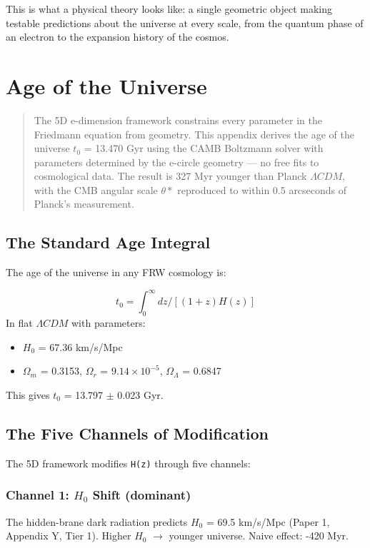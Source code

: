 \documentclass[aps,prd,preprint,superscriptaddress,longbibliography]{revtex4-2}
\begin{document}
This is what a physical theory looks like: a single geometric object making testable predictions about the universe at every scale, from the quantum phase of an electron to the expansion history of the cosmos.


\appendix


\section{Age of the Universe}


\begin{quote}
The 5D e-dimension framework constrains every parameter in the
Friedmann equation from geometry. This appendix derives the age
of the universe $t_{0}$ = 13.470 Gyr using the CAMB Boltzmann solver
with parameters determined by the e-circle geometry --- no free
fits to cosmological data. The result is 327 Myr younger than
Planck $\Lambda CDM$, with the CMB angular scale $\theta*$ reproduced to within
0.5 arcseconds of Planck's measurement.
\end{quote}



\subsection{The Standard Age Integral}

The age of the universe in any FRW cosmology is:


\begin{equation}
    t_{0} = \int_{0}^\infty dz / [(1+z) H(z)]
\end{equation}
In flat $\Lambda CDM$ with \cite{Planck2018_VI} parameters:

\begin{itemize}
  \item $H_{0}$ = 67.36 km/s/Mpc
  \item $\Omega_m$ = 0.3153, $\Omega_r$ = $9.14\times10^{-5}$, $\Omega_\Lambda$ = 0.6847
\end{itemize}

This gives $t_{0}$ = 13.797 $\pm$ 0.023 Gyr.



\subsection{The Five Channels of Modification}

The 5D framework modifies \texttt{H(z)} through five channels:


\subsubsection{Channel 1: $H_{0}$ Shift (dominant)}
The hidden-brane dark radiation predicts $H_{0}$ = 69.5 km/s/Mpc (Paper 1, Appendix Y, Tier 1). Higher $H_{0}$ $\to$ younger universe. Naive effect: -420 Myr.
\end{document}
